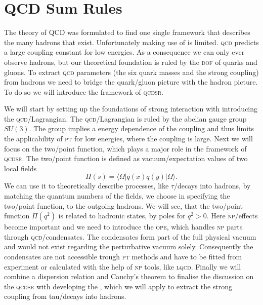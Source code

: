 \documentclass[../../index.tex]{subfiles}
\begin{document}
\chapter{QCD Sum Rules}
\label{ch:theoreticalBackground}
The theory of \textsc{QCD} was formulated to find one single framework that
describes the many hadrons that exist. Unfortunately making use of
 is limited. \textsc{qcd} predicts a
large coupling constant for low energies. As a consequence we can only ever
observe hadrons, but our theoretical foundation is ruled by the \textsc{dof} of
quarks and gluons. To extract \textsc{qcd} parameters (the six quark masses
and the strong coupling) from hadrons we need to bridge the quark\-/gluon
picture with the hadron picture. To do so we will introduce the framework of
\textsc{qcdsr}.

We will start by setting up the foundations of strong interaction with
introducing the \textsc{qcd}\-/Lagrangian. The \textsc{qcd}\-/Lagrangian is
ruled by the abelian gauge group $SU(3)$. The group implies a energy dependence
of the coupling and thus limits the applicability of \textsc{pt} for low
energies, where the coupling is large. Next we will focus on the two\-/point
function, which plays a major role in the framework of \textsc{qcdsr}. The
two\-/point function is defined as vacuum\-/expectation values of two local
fields
\begin{equation}
  \Pi(s) = \langle\Omega\vert q(x)q(y) \vert\Omega\rangle.
\end{equation}
We can use it to theoretically describe processes, like $\tau$\-/decays into
hadrons, by matching the quantum numbers of the fields, we choose in specifying
the two\-/point function, to the outgoing hadrons. We will see, that the
two\-/point function $\Pi(q^2)$ is related to hadronic states, by poles for $q^2
> 0$. Here \textsc{np}\-/effects become important and we need to introduce the
\textsc{ope}, which handles \textsc{np} parts through \textsc{qcd}\-/condensates.
The condensates form part of the full physical vacuum and would not exist
regarding the perturbative vacuum solely. Consequently the condensates are not
accessible trough \textsc{pt} methods and have to be fitted from experiment or
calculated with the help of \textsc{np} tools, like \textsc{lqcd}. Finally we will
combine a dispersion relation and Cauchy's theorem to finalise the discussion on
the \textsc{qcdsr} with developing the ,
which we will apply to extract the strong coupling from tau\-/decays into
hadrons.
\end{document}
